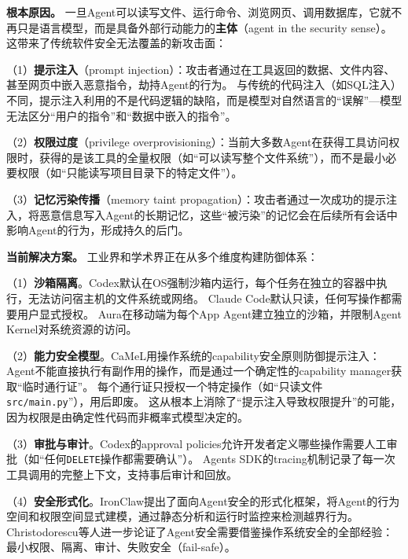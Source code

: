 \textbf{根本原因。}
一旦Agent可以读写文件、运行命令、浏览网页、调用数据库，它就不再只是语言模型，而是具备外部行动能力的\textbf{主体}（agent in the security sense）。
这带来了传统软件安全无法覆盖的新攻击面：

（1）\textbf{提示注入}（prompt injection）：攻击者通过在工具返回的数据、文件内容、甚至网页中嵌入恶意指令，劫持Agent的行为。
与传统的代码注入（如SQL注入）不同，提示注入利用的不是代码逻辑的缺陷，而是模型对自然语言的``误解''---模型无法区分``用户的指令''和``数据中嵌入的指令''\cite{debenedetti2025camel,owasp_agentic2026}。

（2）\textbf{权限过度}（privilege overprovisioning）：当前大多数Agent在获得工具访问权限时，获得的是该工具的全量权限（如``可以读写整个文件系统''），而不是最小必要权限（如``只能读写项目目录下的特定文件''）。

（3）\textbf{记忆污染传播}（memory taint propagation）：攻击者通过一次成功的提示注入，将恶意信息写入Agent的长期记忆，这些``被污染''的记忆会在后续所有会话中影响Agent的行为，形成持久的后门\cite{aura2025}。

\textbf{当前解决方案。}
工业界和学术界正在从多个维度构建防御体系：

（1）\textbf{沙箱隔离}。Codex默认在OS强制沙箱内运行，每个任务在独立的容器中执行，无法访问宿主机的文件系统或网络\cite{openai_codex_sandbox_2026}。
Claude Code默认只读，任何写操作都需要用户显式授权\cite{anthropic_claudecode_security_2026}。
Aura在移动端为每个App Agent建立独立的沙箱，并限制Agent Kernel对系统资源的访问\cite{aura2025}。

（2）\textbf{能力安全模型}。CaMeL\cite{debenedetti2025camel}用操作系统的capability安全原则防御提示注入：Agent不能直接执行有副作用的操作，而是通过一个确定性的capability manager获取``临时通行证''。
每个通行证只授权一个特定操作（如``只读文件\texttt{src/main.py}''），用后即废。
这从根本上消除了``提示注入导致权限提升''的可能，因为权限是由确定性代码而非概率式模型决定的。

（3）\textbf{审批与审计}。Codex的approval policies\cite{openai_codex_approvals_2026}允许开发者定义哪些操作需要人工审批（如``任何\texttt{DELETE}操作都需要确认''）。
Agents SDK的tracing机制\cite{openai_codex_agentsdk_2026}记录了每一次工具调用的完整上下文，支持事后审计和回放。

（4）\textbf{安全形式化}。IronClaw\cite{ironclaw2025}提出了面向Agent安全的形式化框架，将Agent的行为空间和权限空间显式建模，通过静态分析和运行时监控来检测越界行为。
Christodorescu等人\cite{agenticsecurity2025}进一步论证了Agent安全需要借鉴操作系统安全的全部经验：最小权限、隔离、审计、失败安全（fail-safe）。

